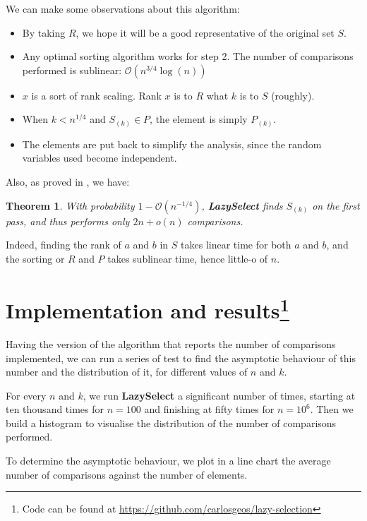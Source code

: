 \documentclass[12pt,a4paper]{article}
\newtheorem{theorem}{Theorem}
\begin{document}
We can make some observations about this algorithm:
\begin{itemize}
\item By taking $R$, we hope it will be a good representative of the
  original set $S$.
\item Any optimal sorting algorithm works for step 2. The number of
  comparisons performed is sublinear: $\mathcal{O}(n^{3/4}\log(n))$
\item $x$ is a sort of rank scaling. Rank $x$ is to $R$ what $k$ is to $S$
  (roughly).
\item When $k < n^{1/4}$ and $S_{(k)} \in P$, the element is simply
  $P_{(k)}$.
\item The elements are put back to simplify the analysis, since the random
  variables used become independent.
\end{itemize}

Also, as proved in \cite[p.~49]{motwani}, we have:

\begin{mdframed}
  \begin{theorem}
    With probability $1 - \mathcal{O}(n^{-1/4})$,
    \textbf{\textup{LazySelect}} finds $S_{(k)}$ on the first pass,
    and thus performs only $2n + o(n)$ comparisons.
    \label{theo1}
  \end{theorem}
\end{mdframed}

Indeed, finding the rank of $a$ and $b$ in $S$ takes linear time for
both $a$ and $b$, and the sorting or $R$ and $P$ takes sublinear time,
hence little-o of $n$.

\section[Implementation and results]{Implementation and results\footnote{Code can be found at
\url{https://github.com/carlosgeos/lazy-selection}}}

Having the version of the algorithm that reports the number of
comparisons implemented, we can run a series of test to find the
asymptotic behaviour of this number and the distribution of it, for
different values of $n$ and $k$.

For every $n$ and $k$, we run \textbf{LazySelect} a significant number
of times, starting at ten thousand times for $n = 100$ and finishing
at fifty times for $n = 10^6$. Then we build a histogram to visualise
the distribution of the number of comparisons performed.

To determine the asymptotic behaviour, we plot in a line chart the
average number of comparisons against the number of elements.
\end{document}
